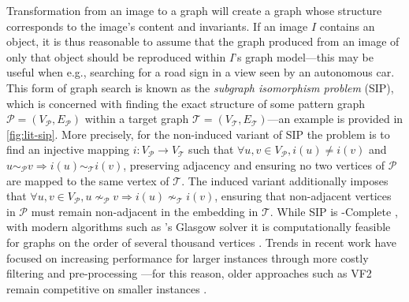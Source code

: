 \documentclass{mpaper}
\begin{document}
Transformation from an image to a graph will create a graph whose structure corresponds to the image's content and invariants.
If an image $I$ contains an object, it is thus reasonable to assume that the graph produced from an image of only that object should be reproduced within $I$'s graph model---this may be useful when e.g., searching for a road sign in a view seen by an autonomous car.
This form of graph search is known as the \emph{subgraph isomorphism problem} (SIP), which is concerned with finding the exact structure of some pattern graph $\mathcal{P}=(V_\mathcal{P}, E_\mathcal{P})$ within a target graph $\mathcal{T}=(V_\mathcal{T}, E_\mathcal{T})$---an example is provided in \cref{fig:lit-sip}.
More precisely, for the non-induced variant of SIP the problem is to find an injective mapping $i : V_\mathcal{P} \rightarrow V_\mathcal{T}$ such that $\forall u,v \in V_\mathcal{P}, i(u) \neq i(v)$ and $u \sim_\mathcal{P} v \Rightarrow i(u) \sim_\mathcal{T} i(v)$, preserving adjacency and ensuring no two vertices of $\mathcal{P}$ are mapped to the same vertex of $\mathcal{T}$.
The induced variant additionally imposes that $\forall u,v \in V_\mathcal{P}, u \nsim_\mathcal{P} v \Rightarrow i(u) \nsim_\mathcal{T} i(v)$, ensuring that non-adjacent vertices in $\mathcal{P}$ must remain non-adjacent in the embedding in $\mathcal{T}$.
While SIP is \NP-Complete \cite{Cook-SAT-SIP-NP, Computers-and-Intractibility}, with modern algorithms such as \citeauthor{SIP-Glasgow}'s Glasgow solver it is computationally feasible for graphs on the order of several thousand vertices \cite{SIP-Glasgow}.
Trends in recent work have focused on increasing performance for larger instances through more costly filtering and pre-processing \cite{SIP-LAD, SIP-SND, SIP-Glasgow}---for this reason, older approaches such as VF2 \cite{SIP-VF2} remain competitive on smaller instances \cite{SIP-Hard-Instances}.
\end{document}
